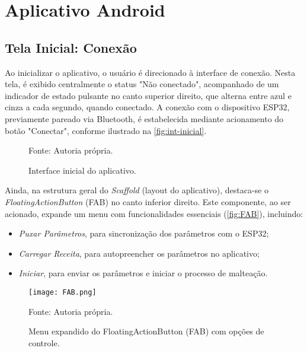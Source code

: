 \section{Aplicativo Android}\label{sec:aplicativo-android}

\subsection{Tela Inicial: Conexão}\label{subsec:conexao}
Ao inicializar o aplicativo, o usuário é direcionado à interface de conexão. Nesta tela, é exibido centralmente o status "Não conectado", acompanhado de um indicador de estado pulsante no canto superior direito, que alterna entre azul e cinza a cada segundo, quando conectado. A conexão com o dispositivo ESP32, previamente pareado via Bluetooth, é estabelecida mediante acionamento do botão "Conectar", conforme ilustrado na \autoref{fig:int-inicial}.

\begin{figure}[ht]
    \caption{Interface inicial do aplicativo.}
    \label{fig:int-inicial}
    \centering
    \hfill
    \hfill

    {\centering\footnotesize Fonte: Autoria própria.\par}

  \end{figure}


Ainda, na estrutura geral do \textit{Scaffold} (layout do aplicativo), destaca-se o \textit{FloatingActionButton} (FAB) no canto inferior direito. Este componente, ao ser acionado, expande um menu com funcionalidades essenciais (\autoref{fig:FAB}), incluindo:

\begin{itemize}
    \item \textit{Puxar Parâmetros}, para sincronização dos parâmetros com o ESP32;
    \item \textit{Carregar Receita}, para autopreencher os parâmetros no aplicativo;
    \item \textit{Iniciar}, para enviar os parâmetros e iniciar o processo de malteação.
\end{itemize}

\begin{figure}[ht]
    \centering
    \caption{Menu expandido do FloatingActionButton (FAB) com opções de controle.}
    \label{fig:FAB}
    \texttt{[image: FAB.png]}

    {\centering\footnotesize Fonte: Autoria própria.\par}
\end{figure}


